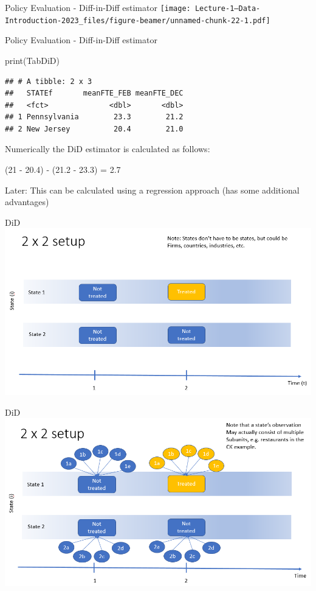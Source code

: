 \documentclass[
  ignorenonframetext,
]{beamer}
\newenvironment{Shaded}{\begin{snugshade}}{\end{snugshade}}
\newcommand{\FunctionTok}[1]{\textcolor[rgb]{0.00,0.00,0.00}{#1}}
\newcommand{\NormalTok}[1]{#1}
\begin{document}
\begin{frame}{Policy Evaluation - Diff-in-Diff estimator}
\protect\hypertarget{policy-evaluation---diff-in-diff-estimator}{}
\texttt{[image: Lecture-1---Data-Introduction-2023\_files/figure-beamer/unnamed-chunk-22-1.pdf]}
\end{frame}

\begin{frame}[fragile]{Policy Evaluation - Diff-in-Diff estimator}
\protect\hypertarget{policy-evaluation---diff-in-diff-estimator-1}{}
\begin{Shaded}
\begin{Highlighting}[]
\FunctionTok{print}\NormalTok{(TabDiD)}
\end{Highlighting}
\end{Shaded}

\begin{verbatim}
## # A tibble: 2 x 3
##   STATEf       meanFTE_FEB meanFTE_DEC
##   <fct>              <dbl>       <dbl>
## 1 Pennsylvania        23.3        21.2
## 2 New Jersey          20.4        21.0
\end{verbatim}

Numerically the DiD estimator is calculated as follows:

(21 - 20.4) - (21.2 - 23.3) = 2.7

Later: This can be calculated using a regression approach (has some
additional advantages)
\end{frame}

\begin{frame}{DiD}
\protect\hypertarget{did}{}
\includegraphics{2x2slide1.PNG}
\end{frame}

\begin{frame}{DiD}
\protect\hypertarget{did-1}{}
\includegraphics{2x2slide2.PNG}
\end{frame}
\end{document}
